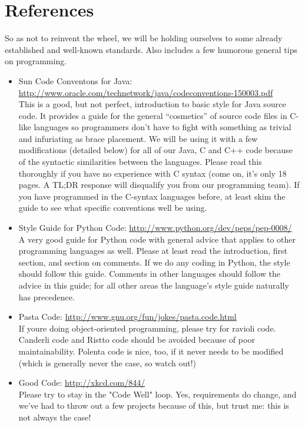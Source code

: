 \documentclass[12pt]{article}
\begin{document}
\section{References}
\label{sec:references}
So as not to reinvent the wheel, we will be holding ourselves to some already established and well-known standards. Also includes a few humorous general tips on programming.
\begin{itemize}
    \item Sun Code Conventons for Java: \url{http://www.oracle.com/technetwork/java/codeconventions-150003.pdf} \\
        This is a good, but not perfect, introduction to basic style for Java source code. It provides a guide for the general ``cosmetics'' of source code files in C-like languages so programmers don't have to fight with something as trivial and infuriating as brace placement. We will be using it with a few modifications (detailed below) for all of our Java, C and C++ code because of the syntactic similarities between the languages. Please read this thoroughly if you have no experience with C syntax (come on, it's only 18 pages. A TL;DR response will disqualify you from our programming team). If you have programmed in the C-syntax languages before, at least skim the guide to see what specific conventions well be using.
    \item \label{pyguide} Style Guide for Python Code: \url{http://www.python.org/dev/peps/pep-0008/} \\
        A very good guide for Python code with general advice that applies to other programming languages as well. Please at least read the introduction, first section, and section on comments. If we do any coding in Python, the style should follow this guide. Comments in other languages should follow the advice in this guide; for all other areas the language's style guide naturally has precedence.
    \item Pasta Code: \url{http://www.gnu.org/fun/jokes/pasta.code.html} \\
        If youre doing object-oriented programming, please try for ravioli code. Canderli code and Ristto code should be avoided because of poor maintainability. Polenta code is nice, too, if it never needs to be modified (which is generally never the case, so watch out!)
    \item Good Code: \url{http://xkcd.com/844/} \\
        Please try to stay in the "Code Well" loop. Yes, requirements do change, and we've had to throw out a few projects because of this, but trust me: this is not always the case!
\end{itemize}
\end{document}
